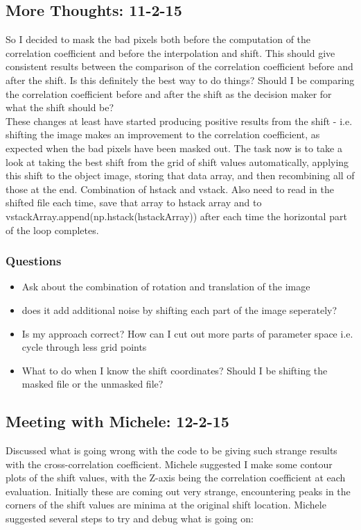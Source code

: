 \documentclass{literature}
\begin{document}
\subsection{More Thoughts: 11-2-15}
So I decided to mask the bad pixels both before the computation of the correlation coefficient and before the interpolation and shift. This should give consistent results between the comparison of the correlation coefficient before and after the shift. Is this definitely the best way to do things? Should I be comparing the correlation coefficient before and after the shift as the decision maker for what the shift should be? \\ 
These changes at least have started producing positive results from the shift - i.e. shifting the image makes an improvement to the correlation coefficient, as expected when the bad pixels have been masked out. The task now is to take a look at taking the best shift from the grid of shift values automatically, applying this shift to the object image, storing that data array, and then recombining all of those at the end. Combination of hstack and vstack. Also need to read in the shifted file each time, save that array to hstack array and to vstackArray.append(np.hstack(hstackArray)) after each time the horizontal part of the loop completes. 
\subsubsection{Questions}
\begin{itemize}
	\item Ask about the combination of rotation and translation of the image 
	\item does it add additional noise by shifting each part of the image seperately?
	\item Is my approach correct? How can I cut out more parts of parameter space i.e. 
		cycle through less grid points 
	\item What to do when I know the shift coordinates? Should I be shifting the masked file or 
	the unmasked file? 

\end{itemize}

\subsection{Meeting with Michele: 12-2-15}
Discussed what is going wrong with the code to be giving such strange results with the cross-correlation coefficient. Michele suggested I make some contour plots of the shift values, with the Z-axis being the correlation coefficient at each evaluation. Initially these are coming out very strange, encountering peaks in the corners of the shift values are minima at the original shift location. Michele suggested several steps to try and debug what is going on: 
\end{document}
